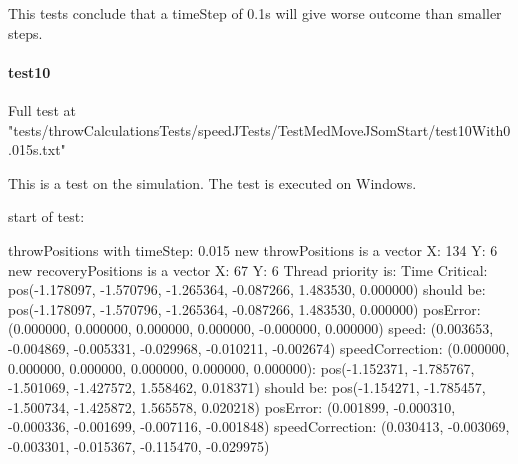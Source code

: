 This tests conclude that a timeStep of 0.1s will give worse outcome than smaller steps.

\paragraph{test10}
Full test at "tests/throwCalculationsTests/speedJTests/TestMedMoveJSomStart/test10With0.015s.txt"

This is a test on the simulation. The test is executed on Windows.

start of test: \newline 

throwPositions with timeStep:  0.015\newline 
new throwPositions is a vector X: 134 Y:  6\newline 
new recoveryPositions is a vector X: 67 Y:  6\newline 
Thread priority is: Time Critical\newline 
[0.000000s - Step 0/134]:\newline 
\hspace{1cm}        pos(-1.178097, -1.570796, -1.265364, -0.087266, 1.483530, 0.000000) should be:\newline 
\hspace{1cm}        pos(-1.178097, -1.570796, -1.265364, -0.087266, 1.483530, 0.000000)\newline 
\hspace{1cm}        posError: (0.000000, 0.000000, 0.000000, 0.000000, -0.000000, 0.000000)\newline 
\hspace{1cm}        speed: (0.003653, -0.004869, -0.005331, -0.029968, -0.010211, -0.002674)\newline 
\hspace{1cm}        speedCorrection: (0.000000, 0.000000, 0.000000, 0.000000, 0.000000, 0.000000)\newline 
[1.995000s - Step 133/134]:\newline 
\hspace{1cm}        pos(-1.152371, -1.785767, -1.501069, -1.427572, 1.558462, 0.018371) should be:\newline 
\hspace{1cm}        pos(-1.154271, -1.785457, -1.500734, -1.425872, 1.565578, 0.020218)\newline 
\hspace{1cm}        posError: (0.001899, -0.000310, -0.000336, -0.001699, -0.007116, -0.001848)\newline 
\hspace{1cm}        speedCorrection: (0.030413, -0.003069, -0.003301, -0.015367, -0.115470, -0.029975)\newline 

